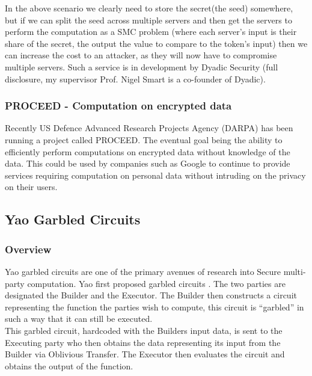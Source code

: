 \documentclass[a4paper,11pt]{article}
\begin{document}
				In the above scenario we clearly need to store the secret(the seed) somewhere, but if we can split the seed across multiple servers and then get the servers to perform the computation as a SMC problem (where each server's input is their share of the secret, the output the value to compare to the token's input) then we can increase the cost to an attacker, as they will now have to compromise multiple servers. Such a service is in development by Dyadic Security (full disclosure, my supervisor Prof. Nigel Smart is a co-founder of Dyadic).

			\subsubsection{PROCEED - Computation on encrypted data} \label{AES_Application}
				Recently US Defence Advanced Research Projects Agency (DARPA) has been running a project called PROCEED. The eventual goal being the ability to efficiently perform computations on encrypted data without knowledge of the data. This could be used by companies such as Google to continue to provide services requiring computation on personal data without intruding on the privacy on their users.

				
		\subsection{Yao Garbled Circuits} \label{Yao_Circuits}

			\subsubsection{Overview} \label{Yao_Overview}
				Yao garbled circuits are one of the primary avenues of research into Secure multi-party computation. Yao first proposed garbled circuits \cite{YaoOriginal}. The two parties are designated the Builder and the Executor. The Builder then constructs a circuit representing the function the parties wish to compute, this circuit is ``garbled'' in such a way that it can still be executed.\\

				This garbled circuit, hardcoded with the Builders input data, is sent to the Executing party who then obtains the data representing its input from the Builder via Oblivious Transfer. The Executor then evaluates the circuit and obtains the output of the function.
\end{document}
